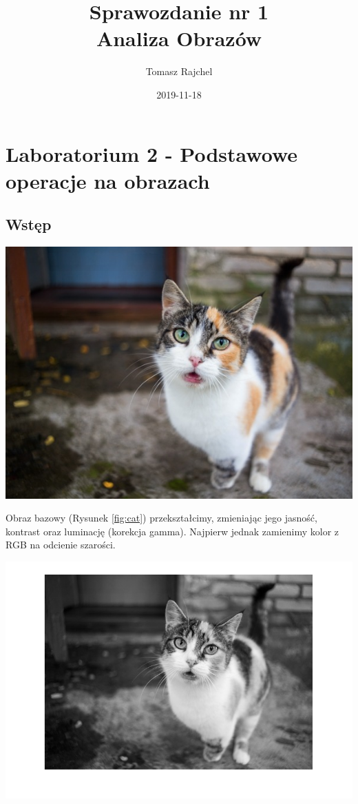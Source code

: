 \documentclass{article}
\title{Sprawozdanie nr 1\\Analiza Obrazów}
\date{2019-11-18}
\author{Tomasz Rajchel}
\begin{document}
	\maketitle

	\tableofcontents
	\newpage
	
	\section{Laboratorium 2 - Podstawowe operacje na obrazach}
	\subsection{Wstęp}
	\begin{center}
		\includegraphics[width=\linewidth]{../../pictures/cat.jpg}
		\label{fig:cat}
	\end{center}
	Obraz bazowy (Rysunek \ref{fig:cat}) przekształcimy, zmieniając jego jasność, kontrast oraz luminację (korekcja gamma). Najpierw jednak zamienimy kolor z RGB na odcienie szarości.

	\begin{center}
		\includegraphics[width=\linewidth]{../../lab02/cat_gray.png}
		\label{fig:cat_gray}
	\end{center}
\end{document}

